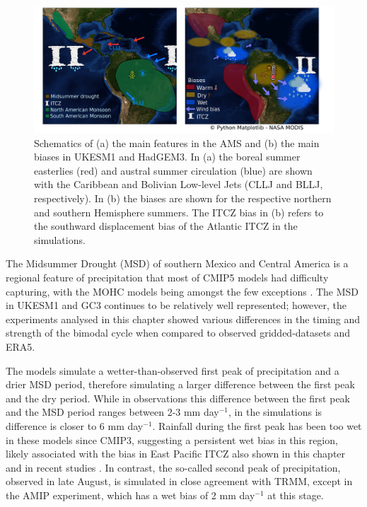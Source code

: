 \begin{figure}[t!]
\centering
 \includegraphics[width=\linewidth]{figures/drawing_d}
\caption{ Schematics of (a) the main features in the AMS and (b) the main biases in UKESM1 and HadGEM3. In (a) the boreal summer easterlies (red) and austral summer circulation (blue) are shown with the Caribbean and Bolivian Low-level Jets (CLLJ and BLLJ, respectively). In (b) the biases are shown for the respective northern and southern Hemisphere summers. The ITCZ bias in (b) refers to the southward displacement bias of the Atlantic ITCZ in the simulations.  }
\label{fig:13}
\end{figure}

    The Midsummer Drought (MSD) of southern Mexico and Central America is a regional feature of precipitation that most of CMIP5 models had difficulty capturing, with the MOHC models being amongst the few exceptions \citep{ryu2014}. 
The MSD in UKESM1 and GC3 continues to be relatively well represented; however, the experiments analysed in this chapter showed various  differences in the timing and strength of the bimodal cycle when compared to observed gridded-datasets and ERA5.  

The models simulate a wetter-than-observed first peak of precipitation and a drier MSD period, therefore simulating a larger difference between the first peak and the dry period. While in observations this difference  between the first peak and the MSD period ranges between 2-3 mm day$^{-1}$, in the simulations is difference is closer to 6 mm day$^{-1}$.
Rainfall during the first peak has been too wet in these models since CMIP3, suggesting a persistent wet bias in this region, likely associated with the bias in East Pacific ITCZ also shown in this chapter and in recent studies \citep{ryu2014,mulcahy2018}. 
In contrast, the so-called second peak of precipitation, observed in late August, is simulated in close agreement with TRMM, except in the AMIP experiment, which has a wet bias of 2 mm day$^{-1}$ at this stage.

